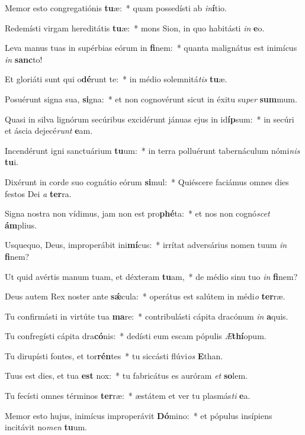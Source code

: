 \item Memor esto congregatiónis \textbf{tu}æ:~* quam possedísti ab \textit{in}\textbf{í}tio.
\item Redemísti virgam hereditátis \textbf{tu}æ:~* mons Sion, in quo habitásti \textit{in} \textbf{e}o.
\item Leva manus tuas in supérbias eórum in \textbf{fi}nem:~* quanta malignátus est inimícus \textit{in} \textbf{sanc}to!
\item Et gloriáti sunt qui o\textbf{dé}runt te:~* in médio solemnitá\textit{tis} \textbf{tu}æ.
\item Posuérunt signa sua, \textbf{si}gna:~* et non cognovérunt sicut in éxitu su\textit{per} \textbf{sum}mum.
\item Quasi in silva lignórum secúribus excidérunt jánuas ejus in id\textbf{íp}sum:~* in secúri et áscia dejecé\textit{runt} \textbf{e}am.
\item Incendérunt igni sanctuárium \textbf{tu}um:~* in terra polluérunt tabernáculum nómi\textit{nis} \textbf{tu}i.
\item Dixérunt in corde suo cognátio eórum \textbf{si}mul:~* Quiéscere faciámus omnes dies festos Dei \textit{a} \textbf{ter}ra.
\item Signa nostra non vídimus, jam non est pro\textbf{phé}ta:~* et nos non cognó\textit{scet} \textbf{ám}plius.
\item Usquequo, Deus, improperábit ini\textbf{mí}cus:~* irrítat adversárius nomen tuum \textit{in} \textbf{fi}nem?
\item Ut quid avértis manum tuam, et déxteram \textbf{tu}am,~* de médio sinu tuo \textit{in} \textbf{fi}nem?
\item Deus autem Rex noster ante \textbf{sǽ}cula:~* operátus est salútem in médi\textit{o} \textbf{ter}ræ.
\item Tu confirmásti in virtúte tua \textbf{ma}re:~* contribulásti cápita dracónum \textit{in} \textbf{a}quis.
\item Tu confregísti cápita dra\textbf{có}nis:~* dedísti eum escam pópulis \textit{Æ}\textbf{thí}opum.
\item Tu dirupísti fontes, et tor\textbf{rén}tes~* tu siccásti flúvi\textit{os} \textbf{E}than.
\item Tuus est dies, et tua \textbf{est} nox:~* tu fabricátus es auróram \textit{et} \textbf{so}lem.
\item Tu fecísti omnes términos \textbf{ter}ræ:~* æstátem et ver tu plasmás\textit{ti} \textbf{e}a.
\item Memor esto hujus, inimícus improperávit \textbf{Dó}mino:~* et pópulus insípiens incitávit no\textit{men} \textbf{tu}um.
